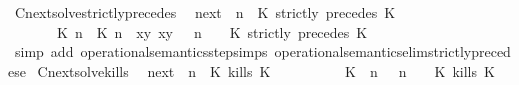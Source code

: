 \begin{isabellebody}
\endisatagproof
{\isafoldproof}%
%
\isadelimproof
\isanewline
%
\endisadelimproof
\isanewline
{}\isamarkupfalse%
\ Cnext{\isacharunderscore}solve{\isacharunderscore}strictly{\isacharunderscore}precedes{\isacharcolon}\isanewline
\ \ {\isacartoucheopen}{\isacharparenleft}{\isasymC}\isactrlsub n\isactrlsub e\isactrlsub x\isactrlsub t\ {\isacharparenleft}{\isasymGamma}{\isacharcomma}\ n\ {\isasymturnstile}\ {\isacharparenleft}{\isacharparenleft}K\ strictly\ precedes\ K\ {\isacharhash}\ {\isasymPsi}{\isacharparenright}\ {\isasymtriangleright}\ {\isasymPhi}{\isacharparenright}{\isacharparenright}\isanewline
\ \ \ \ {\isasymsupseteq}\ {\isacharbraceleft}\ {\isacharparenleft}{\isacharparenleft}{\isasymlceil}{\isacharhash}\isactrlsup {\isasymle}\ K\ n{\isacharcomma}\ {\isacharhash}\isactrlsup {\isacharless}\ K\ n{\isasymrceil}\ {\isasymin}\ {\isacharparenleft}{\isasymlambda}{\isacharparenleft}x{\isacharcomma}y{\isacharparenright}{\isachardot}\ x{\isasymle}y{\isacharparenright}{\isacharparenright}\ {\isacharhash}\ {\isasymGamma}{\isacharparenright}{\isacharcomma}\ n\ {\isasymturnstile}\ {\isasymPsi}\ {\isasymtriangleright}\ {\isacharparenleft}{\isacharparenleft}K\ strictly\ precedes\ K\ {\isacharhash}\ {\isasymPhi}{\isacharparenright}\ {\isacharbraceright}{\isacartoucheclose}\isanewline
%
\isadelimproof
%
\endisadelimproof
%
\isatagproof
{}\isamarkupfalse%
\ {\isacharparenleft}simp\ add{\isacharcolon}\ operational{\isacharunderscore}semantics{\isacharunderscore}step{\isachardot}simps\ operational{\isacharunderscore}semantics{\isacharunderscore}elim{\isachardot}strictly{\isacharunderscore}precedes{\isacharunderscore}e{\isacharparenright}%
\endisatagproof
{\isafoldproof}%
%
\isadelimproof
\isanewline
%
\endisadelimproof
\isanewline
{}\isamarkupfalse%
\ Cnext{\isacharunderscore}solve{\isacharunderscore}kills{\isacharcolon}\isanewline
\ \ {\isacartoucheopen}{\isacharparenleft}{\isasymC}\isactrlsub n\isactrlsub e\isactrlsub x\isactrlsub t\ {\isacharparenleft}{\isasymGamma}{\isacharcomma}\ n\ {\isasymturnstile}\ {\isacharparenleft}{\isacharparenleft}K\ kills\ K\ {\isacharhash}\ {\isasymPsi}{\isacharparenright}\ {\isasymtriangleright}\ {\isasymPhi}{\isacharparenright}{\isacharparenright}\isanewline
\ \ \ \ {\isasymsupseteq}\ {\isacharbraceleft}\ {\isacharparenleft}{\isacharparenleft}K\ {\isasymnot}{\isasymUp}\ n{\isacharparenright}\ {\isacharhash}\ {\isasymGamma}{\isacharparenright}{\isacharcomma}\ n\ {\isasymturnstile}\ {\isasymPsi}\ {\isasymtriangleright}\ {\isacharparenleft}{\isacharparenleft}K\ kills\ K\ {\isacharhash}\ {\isasymPhi}{\isacharparenright}{\isacharcomma}\isanewline

\end{isabellebody}
